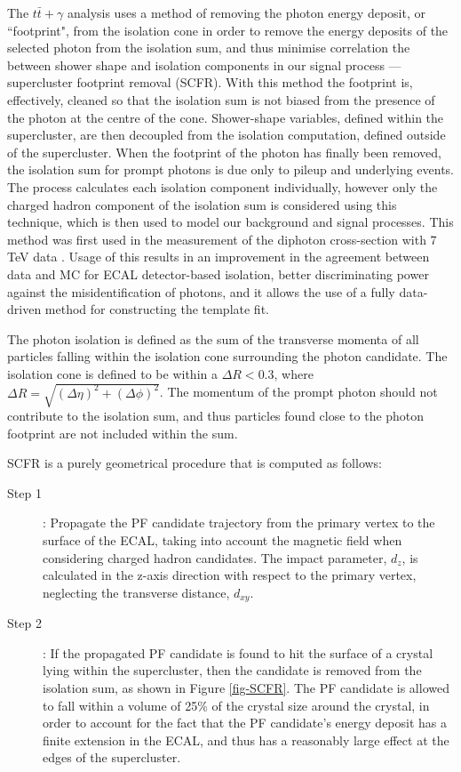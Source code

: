 The $t\bar{t}+\gamma$ analysis uses a method of removing the photon energy deposit, or ``footprint", from the isolation cone in order to remove the energy deposits of the selected photon from the isolation sum, and thus minimise correlation the between shower shape and isolation components in our signal process --- supercluster footprint removal (SCFR). With this method the footprint is, effectively, cleaned so that the isolation sum is not biased from the presence of the photon at the centre of the cone. Shower-shape variables, defined within the supercluster, are then decoupled from the isolation computation, defined outside of the supercluster. When the footprint of the photon has finally been removed, the isolation sum for prompt photons is due only to pileup and underlying events. The process calculates each isolation component individually, however only the charged hadron component of the isolation sum is considered using this technique, which is then used to model our background and signal processes. This method was first used in the measurement of the diphoton cross-section with 7 TeV data \cite{diffxsectdiphoton}. Usage of this results in an improvement in the agreement between data and MC for ECAL detector-based isolation, better discriminating power against the misidentification of photons, and it allows the use of a fully data-driven method for constructing the template fit.

The photon isolation is defined as the sum of the transverse momenta of all particles falling within the isolation cone surrounding the photon candidate. The isolation cone is defined to be within a $\Delta R < 0.3$, where $\Delta R = \sqrt{(\Delta\eta)^2+(\Delta\phi)^2}$. The momentum of the prompt photon should not contribute to the isolation sum, and thus particles found close to the photon footprint are not included within the sum. 

SCFR is a purely geometrical procedure that is computed as follows:

\begin{description}
	\item[Step 1]: Propagate the PF candidate trajectory from the primary vertex to the surface of the ECAL, taking into account the magnetic field when considering charged hadron candidates. The impact parameter, $d_z$, is calculated in the z-axis direction with respect to the primary vertex, neglecting the transverse distance, $d_{xy}$. 
	\item[Step 2]: If the propagated PF candidate is found to hit the surface of a crystal lying within the supercluster, then the candidate is removed from the isolation sum, as shown in Figure \ref{fig-SCFR}. The PF candidate is allowed to fall within a volume of 25\% of the crystal size around the crystal, in order to account for the fact that the PF candidate's energy deposit has a finite extension in the ECAL, and thus has a reasonably large effect at the edges of the supercluster. 
\end{description}

